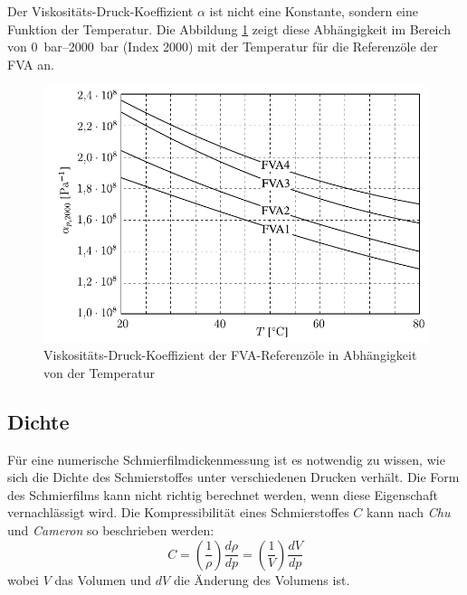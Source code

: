 Der Viskositäts-Druck-Koeffizient $\alpha$ ist nicht eine Konstante, sondern eine Funktion der Temperatur.
Die Abbildung \ref{fig:druckkoeffizient_temperatur} zeigt diese Abhängigkeit im Bereich von \SIrange{0}{2000}{\bar} (Index \num{2000}) mit der Temperatur für die Referenzöle der FVA an.
\begin{figure}[htb]
    \centering
    \includegraphics[]{./images/visko_druck_koeffizient.pdf}
    \caption{Viskositäts-Druck-Koeffizient der FVA-Referenzöle in Abhängigkeit von der Temperatur \cite{schilling_1985}}
    \label{fig:druckkoeffizient_temperatur}
\end{figure}

\subsection*{Dichte}
\label{sub:dichte}

Für eine numerische Schmierfilmdickenmessung ist es notwendig zu wissen, wie sich die Dichte des Schmierstoffes unter verschiedenen Drucken verhält.
Die Form des Schmierfilms kann nicht richtig berechnet werden, wenn diese Eigenschaft vernachlässigt wird.
Die Kompressibilität eines Schmierstoffes $C$ kann nach \textit{Chu} und \textit{Cameron} \cite{chu_1962} so beschrieben werden:
\begin{equation}
    \label{eq:kompressibilitaet}
    C = \left( \frac{1}{\rho} \right) \frac{d\rho}{dp} = \left( \frac{1}{V} \right) \frac{dV}{dp}
\end{equation}
%
wobei $V$ das Volumen und $dV$ die Änderung des Volumens ist.

